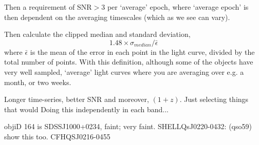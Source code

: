 \documentclass[usenatbib]{mnras}
\begin{document}
Then a requirement of SNR$>3$ per `average' epoch, where `average epoch' is then dependent on the averaging timescales (which as we see can vary). 

Then calculate the clipped median and standard deviation, 
\begin{equation}
1.48 \times \sigma_{median} / \bar{\epsilon}
\end{equation}
where $\bar{\epsilon}$ is the mean of the error in each point in the light curve, divided by the total number of points. 
With this definition, although some of the objects have very well sampled, 
`average' light curves where you are averaging over e.g. a month, or two weeks. 

Longer time-series, better SNR and moreover, $(1+z)$. 
Just selecting things that would
Doing this independently in each band...

objiD 164 is SDSSJ1000+0234, faint; very faint. 
SHELLQsJ0220-0432: (qso59) show this too. 
CFHQSJ0216-0455
\end{document}
